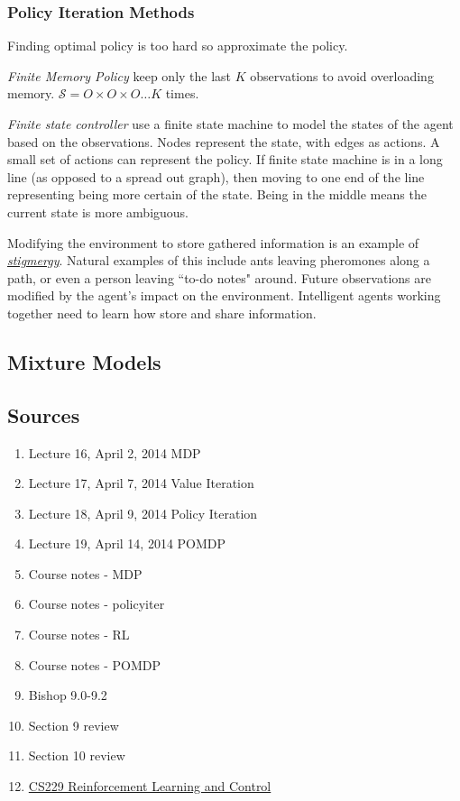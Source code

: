 \documentclass[11pt, oneside]{article}   	%
\begin{document}
\subsubsection{Policy Iteration Methods}

Finding optimal policy is too hard so approximate the policy. 

\emph{Finite Memory Policy} keep only the last $K$ observations to avoid overloading memory. $\mathcal{S} = O \times O \times O \hdots K$ times.

\emph{Finite state controller} use a finite state machine to model the states of the agent based on the observations. Nodes represent the state, with edges as actions. A small set of actions can represent the policy. If finite state machine is in a long line (as opposed to a spread out graph), then moving to one end of the line representing being more certain of the state. Being in the middle means the current state is more ambiguous.

Modifying the environment to store gathered information is an example of \href{http://en.wikipedia.org/wiki/Stigmergy}{\emph{stigmergy}}. Natural examples of this include ants leaving pheromones along a path, or even a person leaving ``to-do notes" around. Future observations are modified by the agent's impact on the environment. Intelligent agents working together need to learn how store and share information.

\subsection{Mixture Models}

\subsection{Sources}

\begin{enumerate}
	\item Lecture 16, April 2, 2014 MDP
	\item Lecture 17, April 7, 2014 Value Iteration
	\item Lecture 18, April 9, 2014 Policy Iteration
	\item Lecture 19, April 14, 2014 POMDP
	\item Course notes - MDP
	\item Course notes - policyiter
	\item Course notes - RL
	\item Course notes - POMDP
	\item Bishop 9.0-9.2
	\item Section 9 review
	\item Section 10 review
	\item \href{http://cs229.stanford.edu/notes/cs229-notes12.pdf}{CS229 Reinforcement Learning and Control}
\end{enumerate}
\end{document}

